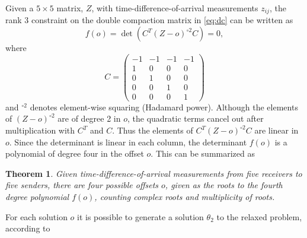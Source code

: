 \documentclass[
]{book}
\newtheorem{theorem}{\noindent \textbf{Theorem}}
\begin{document}
Given a \(5 \times 5\) matrix, \(Z\), with time-difference-of-arrival measurements \(z_{ij}\), the rank \(3\) constraint on the double compaction matrix in \eqref{eq:dc}
can be written as
\begin{equation}
f(o) = \det ( C^T (Z-o)^{\circ 2} C )  = 0, 
\end{equation}
where
\begin{equation}
C = \begin{pmatrix}
-1 & -1 & -1 & -1\\
1 & 0 & 0 & 0\\
0  & 1 & 0 & 0\\
0 & 0 & 1 & 0 \\
0 & 0 & 0 & 1 
\end{pmatrix} 
\end{equation}
and \(^{\circ 2}\) denotes element-wise squaring (Hadamard power).
Although the elements of \((Z-o)^{\circ 2}\) are of degree 2 in \(o\), the quadratic terms cancel out after multiplication with \(C^T\) and \(C\). Thus the elements of \(C^T (Z-o)^{\circ 2} C\) are linear in \(o\).
Since the determinant is linear in each column, the determinant \(f(o)\) is a polynomial of degree four in the offset \(o\). This can be summarized as

\begin{theorem}
Given time-difference-of-arrival measurements from five receivers to five senders, there are four possible offsets $o$, given as the roots to the fourth degree polynomial $f(o)$, counting complex roots and multiplicity of roots. 
\end{theorem}

For each solution \(o\) it is possible to generate a solution \(\theta_2\) to the relaxed problem,
according to
\end{document}
